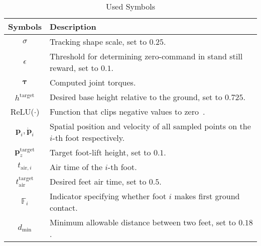 \begin{table}[h]
    \centering
    \caption{Used Symbols}
    \begin{tabular}{c p{7cm}}
    \toprule[1.0pt]
    \textbf{Symbols} & \textbf{Description} \\
    \midrule[0.8pt]
    
    $\sigma$ & Tracking shape scale, set to $0.25$. \\ [0.2ex]
    $\epsilon$ & Threshold for determining zero-command in stand still reward, set to $0.1$. \\ [0.2ex]
    $\boldsymbol{\tau}$ & Computed joint torques. \\ [0.2ex]
    $h^\text{target}$ & Desired base height relative to the ground, set to $0.725$. \\ [0.2ex]
    ReLU($\cdot$) & Function that clips negative values to zero~\cite{fukushima1969visual}. \\ [0.2ex]
    $\mathbf{p}_i, \dot{\mathbf{p}}_i$ & Spatial position and velocity of all sampled points on the $i$-th foot respectively. \\ [0.2ex]
    $\mathbf{p}_{z}^\text{target}$ & Target foot-lift height, set to $0.1$. \\ [0.2ex]
    $t_{\text{air}, i}$ & Air time of the $i$-th foot. \\ [0.3ex]
    $t_{\text{air}}^\text{target}$ & Desired feet air time, set to $0.5$. \\ [0.3ex]
    $\mathbb{F}_i$ & Indicator specifying whether foot $i$ makes first ground contact. \\ [0.2ex]
    $d_\text{min}$ & Minimum allowable distance between two feet, set to $0.18$. \\
    \bottomrule[1.0pt]
    \end{tabular}
    \label{tab:symbol}
\end{table}